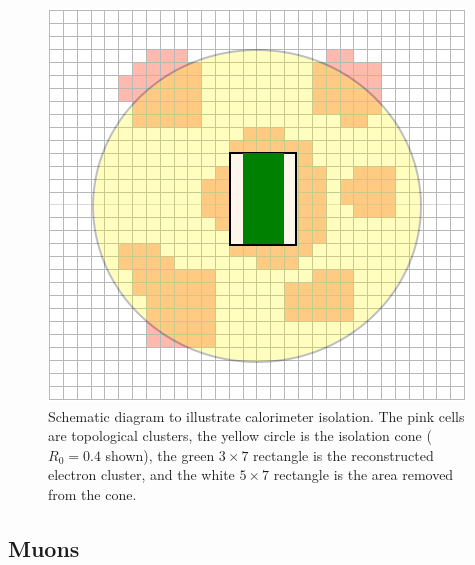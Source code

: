 \begin{figure}
	\includegraphics[width=\smallfigwidth]{tex/selection/el_isolation}
	\caption{Schematic diagram to illustrate calorimeter isolation. The pink cells are 
	topological clusters, the yellow circle is the isolation cone ($R_0 = 0.4$ shown), 
	the green $3 \times 7$ rectangle is the reconstructed electron cluster, and the white 
	$5 \times 7$ rectangle is the area removed from the cone.}
	\label{fig:objects:el_iso}
\end{figure}


\subsection{Muons}
\label{sec:objects:muons}


